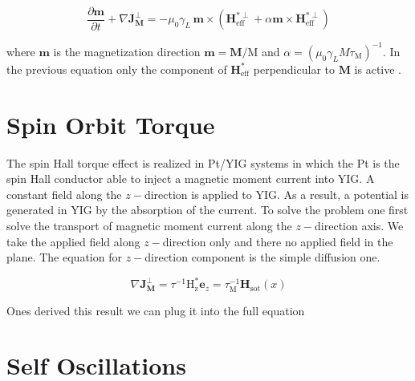 \documentclass[review]{elsarticle}
\begin{document}

\begin{equation}
\label{EQ:d&p_t}
\frac{\partial  \mathbf{m}}{\partial  t} +\nabla\mathbf{J}^{\perp}_{\mathbf{M}}= -\mu_0\gamma_L \, \mathbf{m} \times \left( \mathbf{H}_\mathrm{eff}^{*\perp}+\alpha \mathbf{m} \times \mathbf{H}_\mathrm{eff}
^{*\perp}\right)
\end{equation}

where $\mathbf{m}$ is the magnetization direction $\mathbf{m} = \mathbf{M}/\mathrm{M}$ and $\alpha = (\mu_0\gamma_L M \tau_{\mathrm{M}})^{-1}$. In the previous equation only the 
component of $\mathbf{H}_\mathrm{eff}^*$ perpendicular to $\mathbf{M}$ is active . 

\section{Spin Orbit Torque}

The spin Hall torque effect is realized in Pt/YIG systems in which the Pt is the spin Hall conductor able to inject a magnetic moment current into YIG. A constant field along the $z-$direction  is applied to 
YIG. As a result, a potential is generated in YIG by the absorption of the current. To solve the problem one first solve the transport of magnetic moment current along the $z-$direction axis. We take the 
applied field along $z-$direction only and there no applied field in the plane. The equation for $z-$direction component is the simple diffusion one. 


\begin{equation}
\nabla\mathbf{J}^{\perp}_{\mathbf{M}}=\tau^{-1}\mathrm{H}^*_{\mathrm{\scriptstyle{z}}}\mathbf{e}_z= \tau^{-1}_\mathrm{M}\mathbf{H}_{\mathrm{\scriptstyle{sot}}}(x)
\end{equation}

Ones derived this result we can plug it into the full equation

\section{Self Oscillations}
\end{document}
